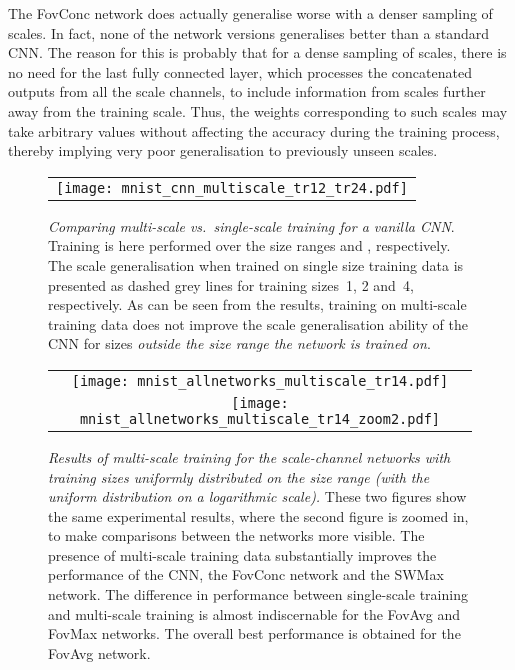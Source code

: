 \documentclass[twocolumn,runningheads]{svjour3}
\begin{document}
The FovConc network does actually generalise worse with a denser sampling
of scales. In fact, none of the network versions generalises better
than a standard CNN. The reason for this is probably that for a dense
sampling of scales, there is no need for the last fully connected
layer, which processes the concatenated outputs from all the scale
channels, to include information from scales further away from the
training scale. Thus, the weights corresponding to such scales may
take arbitrary values without affecting the accuracy during the
training process, thereby implying very poor generalisation to
previously unseen scales.

\begin{figure}[hbpt]
	\begin{tabular}{c}
		\texttt{[image: mnist\_cnn\_multiscale\_tr12\_tr24.pdf]}  
	\end{tabular}
	\caption{{\em Comparing multi-scale vs.\ single-scale training
            for a vanilla CNN\/}. Training is here performed over the
          size ranges  and , respectively. The scale generalisation when
          trained on single size training data is presented as dashed
          grey lines for training sizes~1, 2 and~4, respectively. As can be seen from the results,
          training on multi-scale training
          data does not improve the scale generalisation ability of the CNN for
          sizes {\em outside the size range the network is trained on\/}.}
        \label{fig-multi-scale-training-CNN}
\end{figure}

\begin{figure}[hbpt]
   \begin{tabular}{c}
\texttt{[image: mnist\_allnetworks\_multiscale\_tr14.pdf]}  \\
\texttt{[image: mnist\_allnetworks\_multiscale\_tr14\_zoom2.pdf]}  
   \end{tabular}
   \caption{{\em Results of multi-scale training for the scale-channel
       networks with training sizes uniformly distributed on the size
       range  (with the uniform distribution on a logarithmic scale)\/.}
     These two figures show the same experimental results,
     where the second figure is zoomed in, to make comparisons between the networks more visible.
     The presence of multi-scale training data substantially improves the
     performance of the CNN, the FovConc network and the SWMax
     network. The difference in performance between
     single-scale training and multi-scale training is almost
     indiscernable for the FovAvg and FovMax networks.
     The overall best performance is 
     obtained for the FovAvg network.}
      \label{fig-multi-scale-training-scale-ch-networks}
\end{figure}
   
\end{document}
